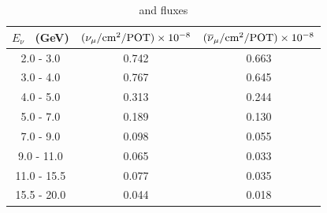 \begingroup
\begin{table}[h]
\tabcolsep=0.11cm
\begin{tabular}{c|c|c}
$E_{\nu}$ \ (GeV) & $(\nu_{\mu}/\text{cm}^{2}/\text{POT}) \times 10^{-8}$ & $(\overline{\nu}_{\mu}/\text{cm}^{2}/\text{POT}) \times 10^{-8}$ \\
\hline
  2.0 - 3.0 & 0.742 & 0.663 \\
  3.0 - 4.0 & 0.767 & 0.645 \\
  4.0 - 5.0 & 0.313 & 0.244 \\
  5.0 - 7.0 & 0.189 & 0.130 \\
  7.0 - 9.0 & 0.098 & 0.055 \\
 9.0 - 11.0 & 0.065 & 0.033 \\
11.0 - 15.5 & 0.077 & 0.035 \\
15.5 - 20.0 & 0.044 & 0.018 \\
\end{tabular}
\caption{ \numu and \numubar fluxes }
\label{tab:flux_norm}
\end{table}
\endgroup

